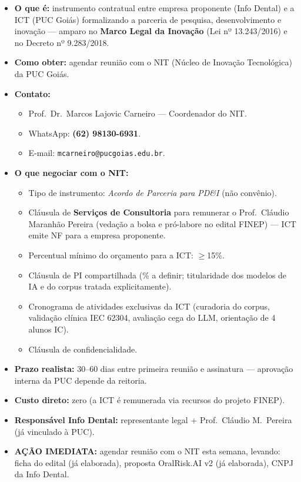 \documentclass[11pt, a4paper]{article}
\begin{document}
\begin{itemize}[label=\textcolor{primaryColor}{$\blacktriangleright$}, leftmargin=1.6em]
    \item \textbf{O que é:} instrumento contratual entre empresa proponente (Info Dental) e a ICT (PUC Goiás) formalizando a parceria de pesquisa, desenvolvimento e inovação --- amparo no \textbf{Marco Legal da Inovação} (Lei nº 13.243/2016) e no Decreto nº 9.283/2018.
    \item \textbf{Como obter:} agendar reunião com o NIT (Núcleo de Inovação Tecnológica) da PUC Goiás.
    \item \textbf{Contato:}
    \begin{itemize}[label=$\circ$, leftmargin=1.4em]
        \item Prof.\ Dr.\ Marcos Lajovic Carneiro --- Coordenador do NIT.
        \item WhatsApp: \textbf{(62) 98130-6931}.
        \item E-mail: \texttt{mcarneiro@pucgoias.edu.br}.
    \end{itemize}
    \item \textbf{O que negociar com o NIT:}
    \begin{itemize}[label=$\circ$, leftmargin=1.4em]
        \item Tipo de instrumento: \emph{Acordo de Parceria para PD\&I} (não convênio).
        \item Cláusula de \textbf{Serviços de Consultoria} para remunerar o Prof.\ Cláudio Maranhão Pereira (vedação a bolsa e pró-labore no edital FINEP) --- ICT emite NF para a empresa proponente.
        \item Percentual mínimo do orçamento para a ICT: $\geq$15\%.
        \item Cláusula de PI compartilhada (\% a definir; titularidade dos modelos de IA e do corpus tratada explicitamente).
        \item Cronograma de atividades exclusivas da ICT (curadoria do corpus, validação clínica IEC 62304, avaliação cega do LLM, orientação de 4 alunos IC).
        \item Cláusula de confidencialidade.
    \end{itemize}
    \item \textbf{Prazo realista:} 30--60 dias entre primeira reunião e assinatura --- aprovação interna da PUC depende da reitoria.
    \item \textbf{Custo direto:} zero (a ICT é remunerada via recursos do projeto FINEP).
    \item \textbf{Responsável Info Dental:} representante legal + Prof.\ Cláudio M.\ Pereira (já vinculado à PUC).
    \item \textcolor{accentColor}{\textbf{AÇÃO IMEDIATA:}} agendar reunião com o NIT esta semana, levando: ficha do edital (já elaborada), proposta OralRisk.AI v2 (já elaborada), CNPJ da Info Dental.
\end{itemize}
\end{document}
